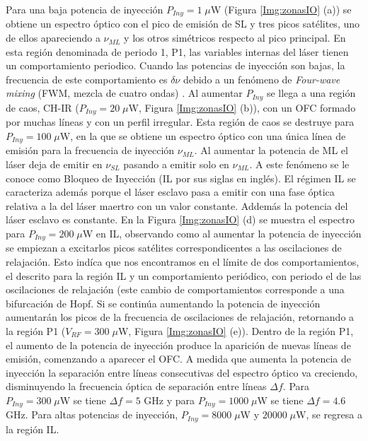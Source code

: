 			Para una baja potencia de inyección $P_{Iny} = 1 \; \mu$W (Figura \ref{Img:zonasIO} (a)) se obtiene un espectro óptico con el pico de emisión de SL y tres picos satélites, uno de ellos apareciendo a $\nu_{ML}$ y los otros simétricos respecto al pico principal. En esta región denominada de periodo 1, P1, las variables internas del láser tienen un comportamiento periodico. Cuando las potencias de inyección son bajas, la frecuencia de este comportamiento es $\delta\nu$ debido a un fenómeno de \textit{Four-wave mixing} (FWM, mezcla de cuatro ondas) \cite{van1995semiconductor}. Al aumentar $P_{Iny}$ se llega a una región de caos, CH-IR ($P_{Iny} = 20\; \mu$W, Figura \ref{Img:zonasIO} (b)), con un OFC formado por muchas líneas y con un perfil irregular. Esta región de caos se destruye para $P_{Iny} = 100\;\mu$W, en la que se obtiene un espectro óptico con una única línea de emisión para la frecuencia de inyección $\nu_{ML}$. Al aumentar la potencia de ML el láser deja de emitir en $\nu_{SL}$ pasando a emitir solo en $\nu_{ML}$. A este fenómeno se le conoce como Bloqueo de Inyección (IL por sus siglas en inglés). El régimen IL se caracteriza además porque el láser esclavo pasa a emitir con una fase óptica relativa a la del láser maertro con un valor constante. Addemás la potencia del láser esclavo es constante. En la Figura \ref{Img:zonasIO} (d) se muestra el espectro para $P_{Iny} = 200\;\mu$W en IL, observando como al aumentar la potencia de inyección se empiezan a excitarlos picos satélites correspondicentes a las oscilaciones de relajación. Esto indíca que nos encontramos en el límite de dos comportamientos, el descrito para la región IL y un comportamiento periódico, con periodo el de las oscilaciones de relajación (este cambio de comportamientos corresponde a una bifurcación de Hopf. Si se continúa aumentando la potencia de inyección aumentarán los picos de la frecuencia de oscilaciones de relajación, retornando a la región P1 ($V_{RF} = 300\;\mu$W, Figura \ref{Img:zonasIO} (e)). Dentro de la región P1, el aumento de la potencia de inyección produce la aparición de nuevas líneas de emisión, comenzando a aparecer el OFC. A medida que aumenta la potencia de inyección la separación entre líneas consecutivas del espectro óptico va creciendo, disminuyendo la frecuencia \'optica de separación entre l\'ineas $\Delta f$. Para $P_{Iny} = 300\;\mu$W se tiene $\Delta f = 5$ GHz y para $P_{Iny} = 1000\;\mu$W se tiene $\Delta f = 4.6$ GHz. Para altas potencias de inyección, $P_{Iny} = 8000 \;\mu$W y $20000 \;\mu$W, se regresa a la región IL.

